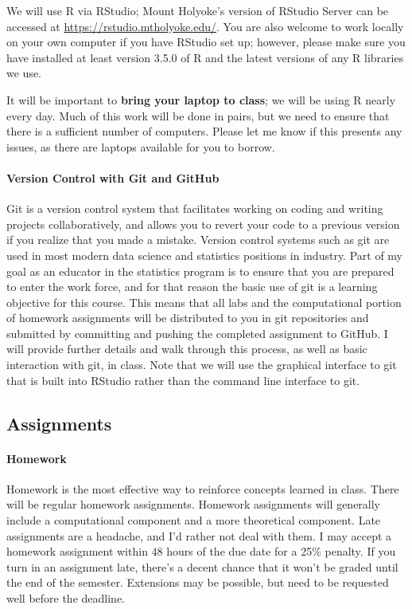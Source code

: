 \documentclass[11pt]{article}
\begin{document}
We will use R via RStudio; Mount Holyoke's version of RStudio Server can be accessed at \url{https://rstudio.mtholyoke.edu/}.  You are also welcome to work locally on your own computer if you have RStudio set up; however, please make sure you have installed at least version 3.5.0 of R and the latest versions of any R libraries we use.

It will be important to \textbf{bring your laptop to class}; we will be using R nearly every day.  Much of this work will be done in pairs, but we need to ensure that there is a sufficient number of computers.  Please let me know if this presents any issues, as there are laptops available for you to borrow.

\paragraph{Version Control with Git and GitHub}

Git is a version control system that facilitates working on coding and writing projects collaboratively, and allows you to revert your code to a previous version if you realize that you made a mistake.  Version control systems such as git are used in most modern data science and statistics positions in industry.  Part of my goal as an educator in the statistics program is to ensure that you are prepared to enter the work force, and for that reason the basic use of git is a learning objective for this course.  This means that all labs and the computational portion of homework assignments will be distributed to you in git repositories and submitted by committing and pushing the completed assignment to GitHub.  I will provide further details and walk through this process, as well as basic interaction with git, in class.  Note that we will use the graphical interface to git that is built into RStudio rather than the command line interface to git.

\subsection*{Assignments}

\paragraph{Homework}
Homework is the most effective way to reinforce concepts learned in class. There will be regular homework assignments. Homework assignments will generally include a computational component and a more theoretical component. Late assignments are a headache, and I'd rather not deal with them. I may accept a homework assignment within 48 hours of the due date for a 25\% penalty. If you turn in an assignment late, there's a decent chance that it won't be graded until the end of the semester. Extensions may be possible, but need to be requested well before the deadline.
\end{document}
